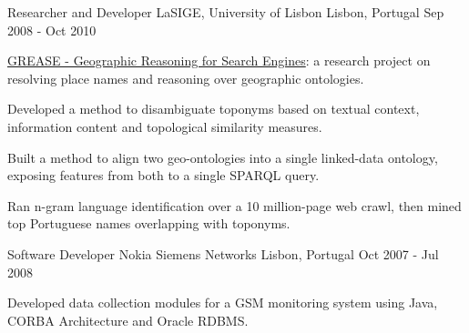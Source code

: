 \begin{cventries}
  \cventry
    {Researcher and Developer} %
    {LaSIGE, University of Lisbon} %
    {Lisbon, Portugal} %
    {Sep 2008 - Oct 2010} %
    {
      \begin{cvitems} %
        \item {\href{https://arquivo.pt/wayback/20181014115718/http://xldb.di.fc.ul.pt/wiki/Grease}{GREASE - Geographic Reasoning for Search Engines}: a research project on resolving place names and reasoning over geographic ontologies.}
        \item {Developed a method to disambiguate toponyms based on textual context, information content and topological similarity measures.}
        \item {Built a method to align two geo-ontologies into a single linked-data ontology, exposing features from both to a single SPARQL query.}
		\item {Ran n-gram language identification over a 10 million-page web crawl, then mined top Portuguese names overlapping with toponyms.}
      \end{cvitems}
    }

  \cventry
    {Software Developer} %
    {Nokia Siemens Networks} %
    {Lisbon, Portugal} %
    {Oct 2007 - Jul 2008} %
    {
      \begin{cvitems} %
        \item {Developed data collection modules for a GSM monitoring system using Java, CORBA Architecture and Oracle RDBMS.}
      \end{cvitems}
    }

\end{cventries}
